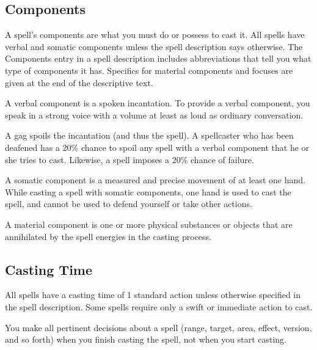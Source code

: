     \subsection{Components}\label{Components}
        A spell's components are what you must do or possess to cast it.
        All spells have verbal and somatic components unless the spell description says otherwise.
        The Components entry in a spell description includes abbreviations that tell you what type of components it has.
        Specifics for material components and focuses are given at the end of the descriptive text.

         A verbal component is a spoken incantation.
        To provide a verbal component, you speak in a strong voice with a volume at least as loud as ordinary conversation.

        A gag spoils the incantation (and thus the spell). A spellcaster who has been deafened has a 20\% chance to spoil any spell with a verbal component that he or she tries to cast.
        Likewise, a  spell imposes a 20\% chance of failure.

         A somatic component is a measured and precise movement of at least one hand.
        While casting a spell with somatic components, one hand is used to cast the spell, and cannot be used to defend yourself or take other actions.

         A material component is one or more physical substances or objects that are annihilated by the spell energies in the casting process.

    \subsection{Casting Time}
        All spells have a casting time of 1 standard action unless otherwise specified in the spell description.
        Some spells require only a swift or immediate action to cast.

        You make all pertinent decisions about a spell (range, target, area, effect, version, and so forth) when you finish casting the spell, not when you start casting.

